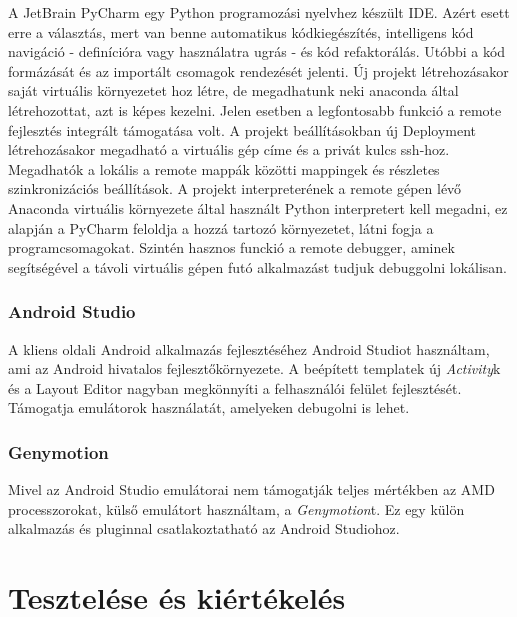 A JetBrain PyCharm egy Python programozási nyelvhez készült IDE. Azért esett erre a választás, mert van benne automatikus kódkiegészítés, intelligens kód navigáció - definícióra vagy használatra ugrás - és kód refaktorálás. Utóbbi a kód formázását és az importált csomagok rendezését jelenti.
\newline
\newline
Új projekt létrehozásakor saját virtuális környezetet hoz létre, de megadhatunk neki anaconda által létrehozottat, azt is képes kezelni. Jelen esetben a legfontosabb funkció a remote fejlesztés integrált támogatása volt.
\newline
\newline
A projekt beállításokban új Deployment létrehozásakor megadható a virtuális gép címe és a privát kulcs ssh-hoz. Megadhatók a lokális a remote mappák közötti mappingek és részletes szinkronizációs beállítások. A projekt interpreterének a remote gépen lévő Anaconda virtuális környezete által használt Python interpretert kell megadni, ez alapján a PyCharm feloldja a hozzá tartozó környezetet, látni fogja a programcsomagokat.
\newline
\newline
Szintén hasznos funckió a remote debugger, aminek segítségével a távoli virtuális gépen futó alkalmazást tudjuk debuggolni lokálisan.


\subsubsection{Android Studio}

A kliens oldali Android alkalmazás fejlesztéséhez Android Studiot használtam, ami az Android hivatalos fejlesztőkörnyezete. A beépített templatek új \emph{Activity}k és a Layout Editor nagyban megkönnyíti a felhasználói felület fejlesztését. Támogatja emulátorok használatát, amelyeken debugolni is lehet.

\subsubsection{Genymotion}

Mivel az Android Studio emulátorai nem támogatják teljes mértékben az AMD processzorokat, külső emulátort használtam, a \emph{Genymotion}t. Ez egy külön alkalmazás és pluginnal csatlakoztatható az Android Studiohoz.

\section{Tesztelése és kiértékelés}

